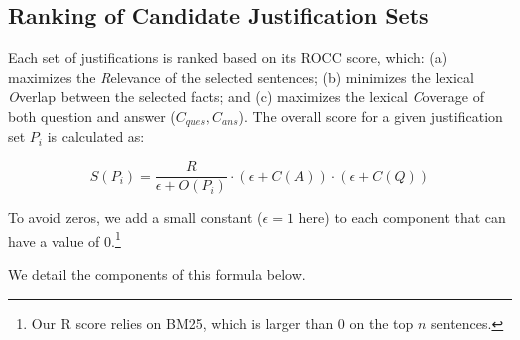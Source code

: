 \subsection{Ranking of Candidate Justification Sets}
\label{ROCC_ranking}

Each set of justifications is ranked based on its ROCC score, which: (a) maximizes the {\em R}elevance of the selected sentences; (b) minimizes the lexical {\em O}verlap between the selected facts; and (c) maximizes the lexical {\em C}overage of both question and answer ($C_{ques}, C_{ans}$). The overall score for a given justification set $P_i$ is calculated as:

\begin{equation}
    S(P_i) = \frac{R}{\epsilon+O(P_i)} \cdot (\epsilon+C(A)) \cdot (\epsilon+C(Q))
    \label{ROCC_formula}
\end{equation}

 
To avoid zeros, we add a small constant ($\epsilon=1$ here) to each component that can have a value of 0.\footnote{Our R score relies on BM25, which is larger than 0 on the top $n$ sentences.}

We detail the components of this formula below.

